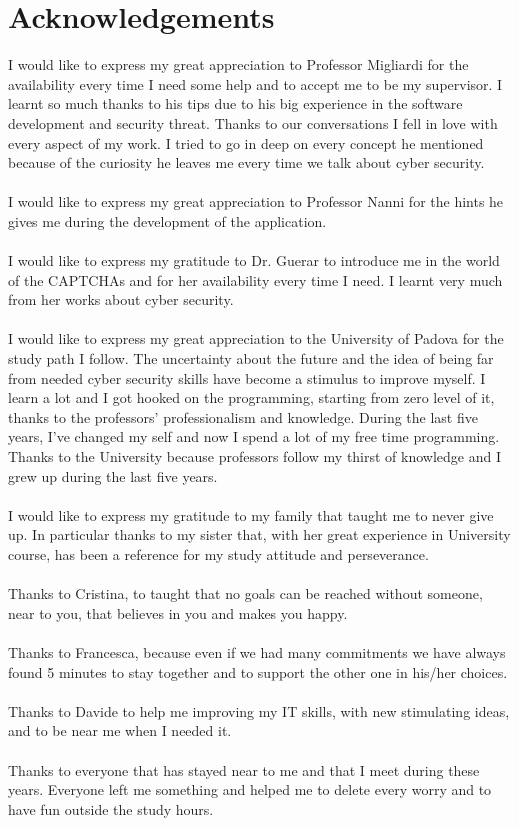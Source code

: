 \chapter*{Acknowledgements}
\renewcommand\chaptermark[1]{\markboth{\uppercase{#1}}{}}
\chaptermark{Acknowledgments}
I would like to express my great appreciation to Professor Migliardi for the availability every time I need some help and to accept me to be my supervisor. I learnt so much thanks to his tips due to his big experience in the software development and security threat. Thanks to our conversations I fell in love with every aspect of my work. I tried to go in deep on every concept he mentioned because of the curiosity he leaves me every time we talk about cyber security.\\\\
I would like to express my great appreciation to Professor Nanni for the hints he gives me during the development of the application.\\\\
I would like to express my gratitude to Dr. Guerar to introduce me in the world of the CAPTCHAs and for her availability every time I need. I learnt very much from her works about cyber security.\\\\
I would like to express my great appreciation to the University of Padova for the study path I follow. The uncertainty about the future and the idea of being far from needed cyber security skills have become a stimulus to improve myself. I learn a lot and I got hooked on the programming, starting from zero level of it, thanks to the professors' professionalism and knowledge. During the last five years, I've changed my self and now I spend a lot of my free time programming. Thanks to the University because professors follow my thirst of knowledge and I grew up during the last five years.\\\\
I would like to express my gratitude to my family that taught me to never give up. In particular thanks to my sister that, with her great experience in University course, has been a reference for my study attitude and perseverance.\\\\
Thanks to Cristina, to taught that no goals can be reached without someone, near to you, that believes in you and makes you happy.\\\\
Thanks to Francesca, because even if we had many commitments we have always found 5 minutes to stay together and to support the other one in his/her choices.\\\\
Thanks to Davide to help me improving my IT skills, with new stimulating ideas, and to be near me when I needed it.\\\\
Thanks to everyone that has stayed near to me and that I meet during these years. Everyone left me something and helped me to delete every worry and to have fun outside the study hours.\\\\